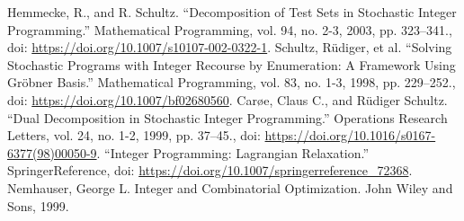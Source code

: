 \documentclass{article}
\theoremstyle{plain}
\theoremstyle{definition}
\begin{document}
\newpage
\newcommand{\doi}[1]{doi: \href{https://doi.org/#1}{#1}}
\begin{thebibliography}{99}  
Hemmecke, R., and R. Schultz. “Decomposition of Test Sets in Stochastic Integer Programming.” Mathematical Programming, vol. 94, no. 2-3, 2003, pp. 323–341., \doi{https://doi.org/10.1007/s10107-002-0322-1}.
Schultz, Rüdiger, et al. “Solving Stochastic Programs with Integer Recourse by Enumeration: A Framework Using Gröbner Basis.” Mathematical Programming, vol. 83, no. 1-3, 1998, pp. 229–252., \doi{https://doi.org/10.1007/bf02680560}.
 Carøe, Claus C., and Rüdiger Schultz. “Dual Decomposition in Stochastic Integer Programming.” Operations Research Letters, vol. 24, no. 1-2, 1999, pp. 37–45., \doi{https://doi.org/10.1016/s0167-6377(98)00050-9}. 
 “Integer Programming: Lagrangian Relaxation.” SpringerReference, \doi{https://doi.org/10.1007/springerreference\_72368}. 
 Nemhauser, George L. Integer and Combinatorial Optimization. John Wiley and Sons, 1999. 



\end{thebibliography}
\end{document}

